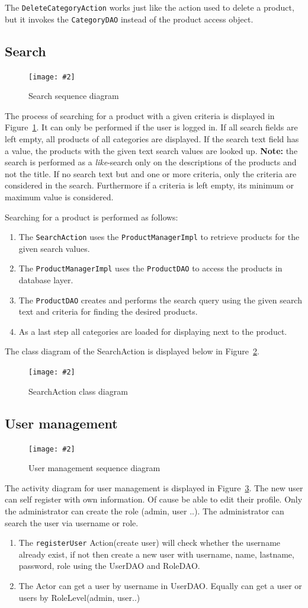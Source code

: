 \documentclass[11pt]{article}
\newcommand{\cgraphic}[3]
{
	\begin{figure}[htb]
		\begin{center}
		\texttt{[image: \#2]}
		\end{center}
		\caption{#3}
		\label{fig:#2}
	\end{figure}
}%
\begin{document}
	The \texttt{DeleteCategoryAction} works just like the action used to delete a product, but it invokes the \texttt{CategoryDAO} instead of the product access object.
    
    \subsection{Search} %
    \cgraphic{.5}{searchAction-seq}{Search sequence diagram}
    The process of searching for a product with a given criteria is displayed in Figure~\ref{fig:searchAction-seq}. It can only be performed if the user is logged in. If all search fields are left empty, all products of all categories are displayed. If the search text field has a value, the products with the given text search values are looked up. \textbf{Note:} the search is performed as a \textit{like}-search only on the descriptions of the products and not the title. If no search text but and one or more criteria, only the criteria are considered in the search. Furthermore if a criteria is left empty, its minimum or maximum value is considered.
    
   Searching for a product is performed as follows: 
   \begin{enumerate}
   	\item The \texttt{SearchAction} uses the \texttt{ProductManagerImpl} to retrieve products for the given search values.
   	\item The \texttt{ProductManagerImpl} uses the \texttt{ProductDAO} to access the products in database layer.
   	\item The \texttt{ProductDAO} creates and performs the search query using the given search text and criteria for finding the desired products.
   	\item As a last step all categories are loaded for displaying next to the product.
   \end{enumerate}
   
   The class diagram of the SearchAction is displayed below in Figure~\ref{fig:searchAction-class}.
   \cgraphic{.5}{searchAction-class}{SearchAction class diagram}  
   
   \subsection{User management} %
   \cgraphic{.5}{user-management}{User management sequence diagram} 
    The activity diagram for user management is displayed in Figure~\ref{fig:user-management}. The new user can self register with own information. Of cause be able to edit their profile. Only the administrator can create the role (admin, user ..). The administrator can search the user via username or role.
    
    \begin{enumerate}
    	\item The \texttt{registerUser} Action(create user) will check whether the username already exist, if not then create a new user with username, name, lastname, password, role using the UserDAO and RoleDAO.
    	\item The Actor can get a user by username in UserDAO. Equally can get a user or users by RoleLevel(admin, user..) 
    \end{enumerate}
      
\end{document}
